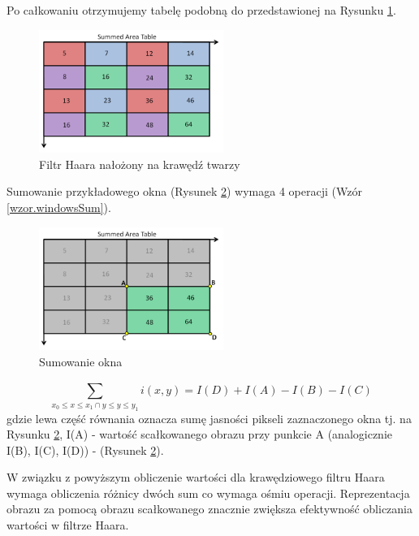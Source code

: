 \documentclass[a4paper,twoside,12pt]{book}
\begin{document}
    Po całkowaniu otrzymujemy tabelę podobną do przedstawionej na Rysunku \ref{fig.poCalkowaniu}.
    \begin{figure}
        \centering
        \includegraphics[width=6cm]{Obrazy/poCalkowaniu.jpg}
        \caption{Filtr Haara nałożony na krawędź twarzy \cite{integralImages}}
        \label{fig.poCalkowaniu}
    \end{figure}

    Sumowanie przykładowego okna (Rysunek \ref{fig.sumowanieOkna}) wymaga 4 operacji (Wzór \ref{wzor.windowsSum}).
    \begin{figure}
        \centering
        \includegraphics[width=6cm]{Obrazy/sumowanieOkna.jpg}
        \caption{Sumowanie okna \cite{integralImages}}
        \label{fig.sumowanieOkna}
    \end{figure}


    \large
    \begin{equation}
        \sum_{x_0\leq x \leq x_1\cap {y}\leq y \leq y_1}^{} i(x,y) = I(D) + I(A) - I(B) - I(C)
        \label{wzor.windowsSum}
    \end{equation}
    \normalsize
    gdzie lewa część równania oznacza sumę jasności pikseli
    zaznaczonego okna tj.
    na Rysunku \ref{fig.sumowanieOkna}, I(A) - wartość scałkowanego obrazu przy punkcie A
    (analogicznie I(B), I(C), I(D)) - (Rysunek \ref{fig.sumowanieOkna}).

    W związku z powyższym obliczenie wartości dla krawędziowego filtru Haara wymaga obliczenia różnicy dwóch sum co
    wymaga ośmiu operacji.
    Reprezentacja obrazu za pomocą obrazu scałkowanego znacznie zwiększa efektywność obliczania wartości w filtrze
    Haara.
\end{document}
